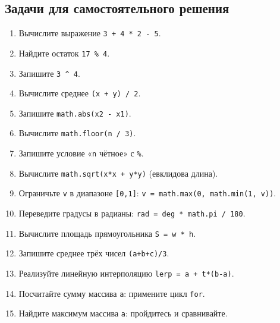 \subsection*{Задачи для самостоятельного решения}
\begin{enumerate}
  \item Вычислите выражение \verb|3 + 4 * 2 - 5|.
  \item Найдите остаток \verb|17 % 4|.
  \item Запишите \verb|3 ^ 4|.
  \item Вычислите среднее \verb|(x + y) / 2|.
  \item Запишите \verb|math.abs(x2 - x1)|.
  \item Вычислите \verb|math.floor(n / 3)|.
  \item Запишите условие «\verb|n| чётное» с \verb|%|.
  \item Вычислите \verb|math.sqrt(x*x + y*y)| (евклидова длина).
  \item Ограничьте \verb|v| в диапазоне \verb|[0,1]|: \verb|v = math.max(0, math.min(1, v))|.
  \item Переведите градусы в радианы: \verb|rad = deg * math.pi / 180|.
  \item Вычислите площадь прямоугольника \verb|S = w * h|.
  \item Запишите среднее трёх чисел \verb|(a+b+c)/3|.
  \item Реализуйте линейную интерполяцию \verb|lerp = a + t*(b-a)|.
  \item Посчитайте сумму массива \verb|a|: примените цикл \verb|for|.
  \item Найдите максимум массива \verb|a|: пройдитесь и сравнивайте.
\end{enumerate}
